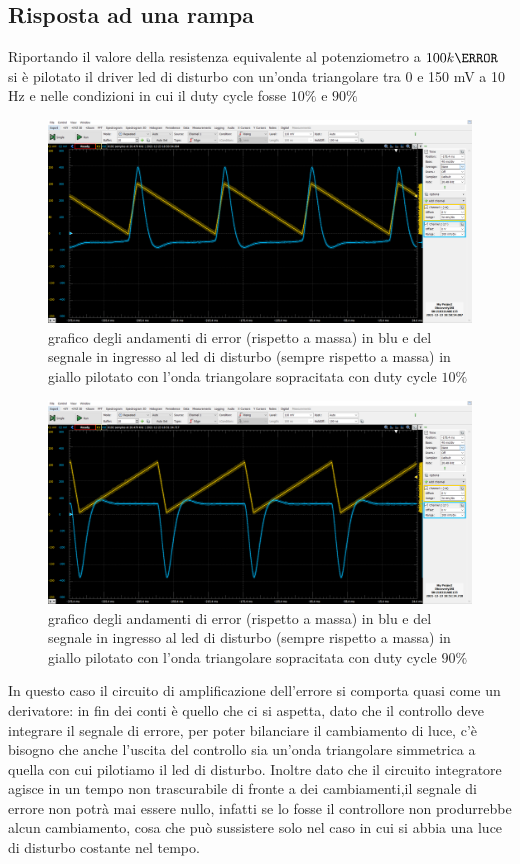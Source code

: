 \documentclass[10pt, a4paper, italian]{article}
\begin{document}
\subsection{Risposta ad una rampa}
Riportando il valore della resistenza equivalente al potenziometro a $100 k\ohm$ si è pilotato il driver led di disturbo con un'onda triangolare tra 0 e 150 mV a 10 Hz e nelle condizioni in cui il duty cycle fosse $10 \percent$ e $90 \percent$
\begin{figure}[H]
    \centering
	\includegraphics[scale=0.7]{8}
    \caption{grafico degli andamenti di error (rispetto a massa) in blu e del segnale in ingresso al led di disturbo (sempre rispetto a massa) in giallo pilotato con l'onda triangolare sopracitata con duty cycle $10 \percent$
    \label{fig: Draft1}}
\end{figure}

\begin{figure}[H]
    \centering
	\includegraphics[scale=0.7]{8.1}
    \caption{grafico degli andamenti di error (rispetto a massa) in blu e del segnale in ingresso al led di disturbo (sempre rispetto a massa) in giallo pilotato con l'onda triangolare sopracitata con duty cycle $90 \percent$
    \label{fig: Draft1}}
\end{figure}
In questo caso il circuito di amplificazione dell'errore si comporta quasi come un derivatore: in fin dei conti è quello che ci si aspetta, dato che il controllo deve integrare il segnale di errore, per poter bilanciare il cambiamento di luce, c'è bisogno che anche l'uscita del controllo sia un'onda triangolare simmetrica a quella con cui pilotiamo il led di disturbo. Inoltre dato che il circuito integratore agisce in un tempo non trascurabile di fronte a dei cambiamenti,il segnale di errore non potrà mai essere nullo, infatti se lo fosse il controllore non produrrebbe alcun cambiamento, cosa che può sussistere solo nel caso in cui si abbia una luce di disturbo costante nel tempo.
\end{document}
